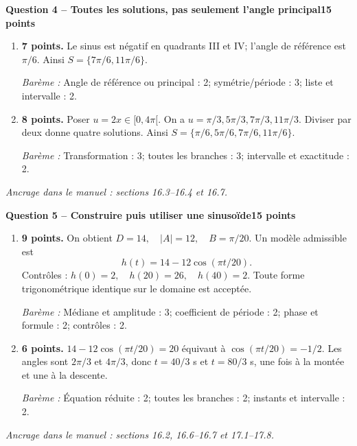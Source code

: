 \documentclass[11pt,a4paper]{article}
\begin{document}
\newpage
{\large\bfseries Question 4 -- Toutes les solutions, pas seulement l’angle principal}\hfill\textbf{15 points}\par
\begin{enumerate}
\item \textbf{7 points.} Le sinus est négatif en quadrants III et IV; l’angle de référence est \(\pi/6\). Ainsi \(S=\{7\pi/6,11\pi/6\}\).
\par{\small\textit{Barème : }Angle de référence ou principal : 2; symétrie/période : 3; liste et intervalle : 2.}
\item \textbf{8 points.} Poser \(u=2x\in[0,4\pi[\). On a \(u=\pi/3,5\pi/3,7\pi/3,11\pi/3\). Diviser par deux donne quatre solutions. Ainsi \(S=\{\pi/6,5\pi/6,7\pi/6,11\pi/6\}\).
\par{\small\textit{Barème : }Transformation : 3; toutes les branches : 3; intervalle et exactitude : 2.}
\end{enumerate}
\vfill {\small\textit{Ancrage dans le manuel : sections 16.3--16.4 et 16.7.}}

\newpage
{\large\bfseries Question 5 -- Construire puis utiliser une sinusoïde}\hfill\textbf{15 points}\par
\begin{enumerate}
\item \textbf{9 points.} On obtient \(D=14,\quad |A|=12,\quad B=\pi/20\). Un modèle admissible est \[h(t)=14-12\cos(\pi t/20).\] Contrôles : \(h(0)=2,\quad h(20)=26,\quad h(40)=2\). Toute forme trigonométrique identique sur le domaine est acceptée.
\par{\small\textit{Barème : }Médiane et amplitude : 3; coefficient de période : 2; phase et formule : 2; contrôles : 2.}
\item \textbf{6 points.} \(14-12\cos(\pi t/20)=20\) équivaut à \(\cos(\pi t/20)=-1/2\). Les angles sont \(2\pi/3\) et \(4\pi/3\), donc \(t=40/3\) s et \(t=80/3\) s, une fois à la montée et une à la descente.
\par{\small\textit{Barème : }Équation réduite : 2; toutes les branches : 2; instants et intervalle : 2.}
\end{enumerate}
\vfill {\small\textit{Ancrage dans le manuel : sections 16.2, 16.6--16.7 et 17.1--17.8.}}
\end{document}

